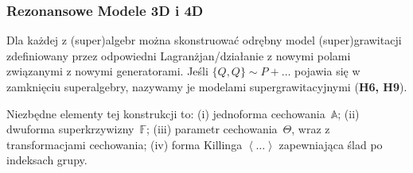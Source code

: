 \documentclass[12pt,a4paper]{article}
\begin{document}
\subsubsection{Rezonansowe Modele 3D i 4D}\label{Models}

Dla każdej z (super)algebr można skonstruować odrębny model (super)grawitacji zdefiniowany przez odpowiedni Lagranżjan/działanie z nowymi polami związanymi z nowymi generatorami. Jeśli $\{Q, Q\} \sim P+\ldots$ pojawia się w zamknięciu superalgebry, nazywamy je modelami supergrawitacyjnymi (\textbf{H6, H9}).

Niezbędne elementy tej konstrukcji to: (i) jednoforma cechowania~$\mathbb{A}$; (ii) dwuforma superkrzywizny~$\mathbb{F}$; (iii) parametr cechowania~$\Theta$, wraz z transformacjami cechowania; (iv) forma Killinga $\left\langle \dots \right\rangle$ zapewniająca ślad po indeksach grupy.
\end{document}
